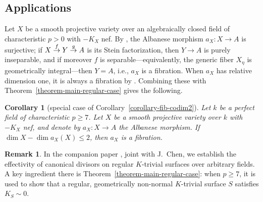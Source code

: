 \documentclass[reqno,oneside]{amsart}
\newtheorem{corollary}[theorem]{Corollary}
\theoremstyle{definition}
\newtheorem{remark}[theorem]{Remark}
\theoremstyle{plain}
\numberwithin{equation}{section}
\begin{document}
\subsection{Applications}%
Let $X$ be a smooth projective variety over an algebraically closed field of characteristic $p>0$ with $-K_X$ nef.
By \cite[Theorem~1.3]{EP23}, the Albanese morphism $a_X\colon X\to A$ is surjective; if $X\buildrel f\over\to Y \buildrel g\over\to A$ is its Stein factorization, then $Y\to A$ is purely inseparable, and if moreover $f$ is separable---equivalently, the generic fiber $X_{\eta}$ is geometrically integral---then $Y=A$, i.e., $a_X$ is a fibration.
When $a_X$ has relative dimension one, it is always a fibration by \cite[Theorem~1.5]{CWZ26a}.
Combining these with Theorem~\ref{theorem-main-regular-case} gives the following.
\begin{corollary}[special case of Corollary~\ref{corollary-fib-codim2}]\label{corollary-intro-fib-codim2}
  Let $k$ be a perfect field of characteristic $p\ge7$.
  Let $X$ be a smooth projective variety over $k$ with $-K_X$ nef, and denote by $a_X\colon X\to A$  the Albanese morphism.
  If $\dim X -\dim a_X(X) \leq 2$, then $a_X$ is a fibration.
\end{corollary}

\begin{remark}
   In the companion paper \cite{CWZ26b}, joint with J.~Chen, we establish the effectivity of canonical divisors on regular $K$-trivial surfaces over arbitrary fields.
  A key ingredient there is Theorem~\ref{theorem-main-regular-case}: when $p\ge7$, it is used to show that a regular, geometrically non-normal $K$-trivial surface $S$ satisfies $K_S\sim0$.
\end{remark}
\end{document}
